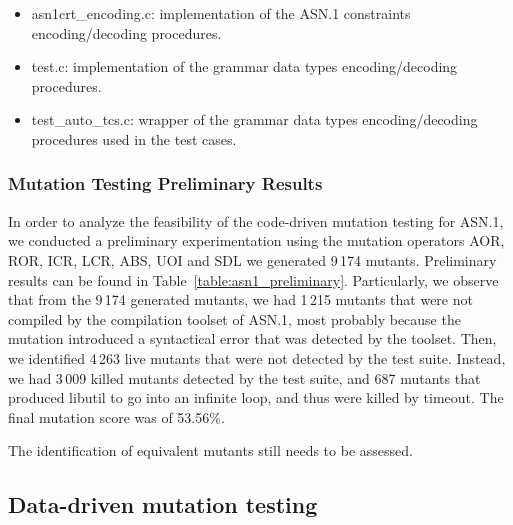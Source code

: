\begin{itemize}
	\item asn1crt\_encoding.c: implementation of the ASN.1 constraints encoding/decoding procedures.
	\item test.c: implementation of the grammar data types encoding/decoding procedures.
	\item test\_auto\_tcs.c: wrapper of the grammar data types encoding/decoding procedures used in the test cases.
\end{itemize}

\subsubsection{Mutation Testing Preliminary Results}



In order to analyze the feasibility of the code-driven mutation testing for ASN.1, we conducted a preliminary experimentation using the mutation operators AOR, ROR, ICR, LCR, ABS, UOI and SDL we generated 9\,174 mutants. Preliminary results can be found in Table~\ref{table:asn1_preliminary}.
Particularly, we observe that from the 9\,174 generated mutants, we had 1\,215 mutants that were not compiled by the compilation toolset of ASN.1, most probably because the mutation introduced a syntactical error that was detected by the toolset.
Then, we identified 4\,263 live mutants that were not detected by the test suite. Instead, we had 3\,009 killed mutants detected by the test suite, and 687 mutants that produced libutil to go into an infinite loop, and thus were killed by timeout. The final mutation score was of 53.56\%.

The identification of equivalent mutants still needs to be assessed.


\subsection{Data-driven mutation testing}









